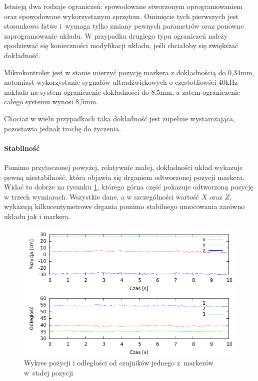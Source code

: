 Istnieją dwa rodzaje ograniczeń: spowodowane stworzonym oprogramowaniem oraz spowodowane wykorzystanym sprzętem. Ominięcie tych pierwszych jest stosunkowo łatwe i~wymaga tylko zmiany pewnych parametrów oraz ponowne zaprogramowanie układu. W przypadku drugiego typu ograniczeń należy spodziewać się konieczności modyfikacji układu, jeśli chciałoby się zwiększać dokładność.

Mikrokontroler jest w stanie mierzyć pozycję markera z dokładnością do 0,34mm, natomiast wykorzystanie sygnałów ultradźwiękowych o częstotliowści 40kHz nakłada na system ograniczenie dokładności do 8,5mm, a zatem ograniczenie całego systemu wynosi 8,5mm.

Chociaż w wielu przypadkach taka dokładność jest zupełnie wystarczająca, pozostawia jednak trochę do życzenia.

\paragraph{Stabilność}
Pomimo przytoczonej powyżej, relatywnie małej, dokładności układ wykazuje pewną niestabilność, która objawia się drganiem odtworzonej pozycji markera. Widać to dobrze na rysunku \ref{fig:position_shaky}, którego górna część pokazuje odtworzoną pozycję w trzech wymiarach. Wszystkie dane, a w szczególności wartość $X$ oraz $Z$, wykazują kilkucentymetrowe drgania pomimo stabilnego umocowania zarówno układu jak i markera.

\begin{figure}
 \includegraphics[width=\textwidth]{gfx/pozycja/pozycja.pdf}
 \caption[Wykres pozycji i odległości jednego z markerów]{Wykres pozycji i odległości od czujników jednego z~markerów w~stałej pozycji}
 \label{fig:position_shaky}
\end{figure}

